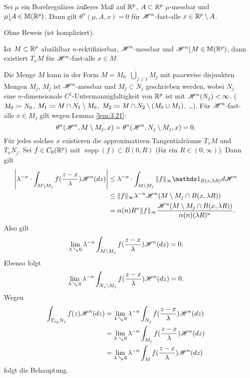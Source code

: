 \documentclass[a4paper,twoside,DIV15,BCOR12mm]{scrbook}
\newcommand{\ind}{\mathds 1}
\newcommand{\HM}{\H}
\DeclareMathOperator{\supp}{supp}
\DeclareMathOperator{\downto}{\searrow}
\newcommand{\MR}{\lfloor}
\begin{document}
\begin{lemma}\label{lem:3.21}
Sei \(\mu\) ein Borelreguläres äußeres Maß auf \(\mathbb{R}^p\), \(A \subset \mathbb{R}^p\) \(\mu\)-messbar und \(\mu\MR A\in \mathbb{M}(\MdR^p)\). Dann gilt \(\theta^n(\mu,A,x)=0\) für \(\HM^n\)-fast-alle \(x\in\mathbb{R}^p\setminus A\).
\end{lemma}
Ohne Beweis (ist kompliziert).

\begin{proposition}\label{prop:3.22}
Ist \(M \subset \mathbb{R}^p\) abzählbar \(n\)-rektifizierbar, \(\HM^n\)-messbar und \(\HM^n\MR M \in \mathbb{M}(\MdR^p)\), dann existiert \(T_x M\) für \(\HM^n\)-fast-alle \(x \in M\).
\end{proposition}

\begin{beweis}
Die Menge \(M\) kann in der Form \(M = M_0 \mathop{\dot\cup} {\dot\bigcup}_{j\geq 1} M_j\) mit paarweise disjunkten Mengen \(M_j\), \(M_j\) ist \(\HM^n\)-messbar und \(M_j \subset N_j\) geschrieben werden, wobei \(N_j\) eine \(n\)-dimensionale \(C^1\)-Untermannigfaltigkeit von \(\mathbb{R}^p\) ist mit \(\HM^n(N_j)<\infty\). (\(M_0 \da N_0\), \(M_1 \da M \cap N_1 \setminus M_0\), \(M_2 \da M \cap N_2 \setminus (M_0 \cup M_1)\), \dots). Für \(\HM^n\)-fast-alle \(x \in M_j\) gilt wegen Lemma \ref{lem:3.21}:
\[
\theta^n(\HM^n, M \setminus M_j, x) = \theta^n(\HM^n, N_j \setminus M_j, x) = 0.
\]
Für jedes solches \(x\) existieren die approximativen Tangentialräume \(T_x M\) und \(T_x N_j\). Sei \(f \in C_0(\mathbb{R}^p)\) mit \(\supp(f) \subset B(0,R)\) (für ein \(R \in (0,\infty)\)). Dann gilt
\begin{align*}
\left| \lambda^{-n} \cdot \int_{M\setminus M_j} f(\frac{z-x}\lambda) \HM^n(dz) \right| &\leq \lambda^{-n} \cdot \int_{M\setminus M_j} \|f\|_\infty \ind_{B(x,\lambda R)} d\HM^n \\
&\leq \|f\|_\infty \lambda^{-n} \HM^n(M\setminus M_j\cap B(x,\lambda R)) \\
&= \alpha(n) R^n \|f\|_\infty \frac{\HM^n (M\setminus M_j \cap B(x,\lambda R))}{\alpha(n) (\lambda R)^n}.
\end{align*}
Also gilt
\[\lim_{\lambda \downto 0} \lambda^{-n} \int_{M\setminus M_j} f(\frac{z-x}\lambda) \HM^n (dz) = 0.
\] 
Ebenso folgt
\[
\lim_{\lambda\downto0} \lambda^{-n} \int_{N_j\setminus M_j} f(\frac{z-x}\lambda) \HM^n(dz) = 0.
\]
Wegen
\begin{align*}
\int_{T_{x_0}N_j} f(z) \HM^n(dz) &= \lim_{\lambda\downto0} \lambda^{-n}\int_{N_j} f(\frac{z-x}\lambda) \HM^n(dz) \\
&= \lim_{\lambda\downto0} \lambda^{-n} \int_{M_j} f(\frac{z-x}\lambda)\HM^n(dz) \\
&= \lim_{\lambda\downto0} \lambda^{-n} \int_M f(\frac{z-x}\lambda) \HM^n(dz)
\end{align*}
folgt die Behauptung.
\end{beweis}
\end{document}
